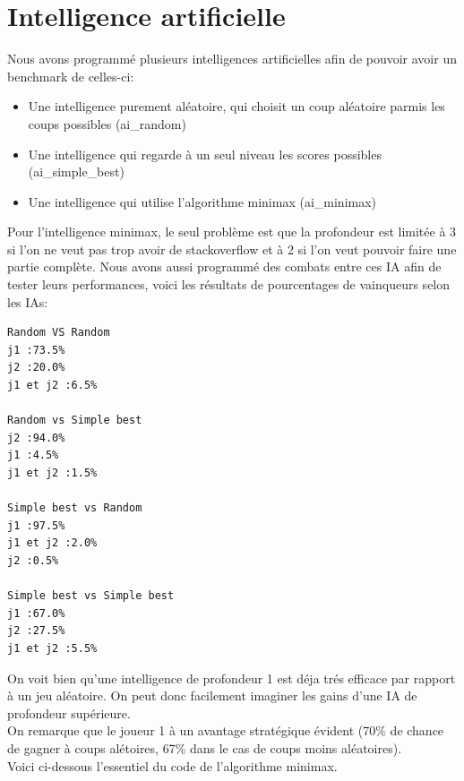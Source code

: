 \documentclass[11pt,a4paper,twoside,french,svgnames]{report}
\begin{document}
\section{Intelligence artificielle}
Nous avons programmé plusieurs intelligences artificielles afin de pouvoir avoir un benchmark de celles-ci:
\begin{itemize}
    \item Une intelligence purement aléatoire, qui choisit un coup aléatoire parmis les coups possibles (ai\_random)
    \item Une intelligence qui regarde à un seul niveau les scores possibles (ai\_simple\_best)
    \item Une intelligence qui utilise l'algorithme minimax (ai\_minimax)
\end{itemize}

Pour l'intelligence minimax, le seul problème est que la profondeur est limitée à 3 si l'on ne veut pas trop avoir de stackoverflow et à 2 si l'on veut pouvoir faire une partie complète.
Nous avons aussi programmé des combats entre ces IA afin de tester leurs performances, voici les résultats de pourcentages de vainqueurs selon les IAs:

\begin{lstlisting}
Random VS Random
j1 :73.5%
j2 :20.0%
j1 et j2 :6.5%

Random vs Simple best
j2 :94.0%
j1 :4.5%
j1 et j2 :1.5%

Simple best vs Random
j1 :97.5%
j1 et j2 :2.0%
j2 :0.5%

Simple best vs Simple best
j1 :67.0%
j2 :27.5%
j1 et j2 :5.5%
\end{lstlisting}

On voit bien qu'une intelligence de profondeur 1 est déja trés efficace par rapport à un jeu aléatoire. On peut donc facilement imaginer les gains d'une IA de profondeur supérieure.
\\

On remarque que le joueur 1 à un avantage stratégique évident (70\% de chance de gagner à coups alétoires, 67\% dans le cas de coups moins aléatoires).
\\

Voici ci-dessous l'essentiel du code de l'algorithme minimax.
\end{document}
